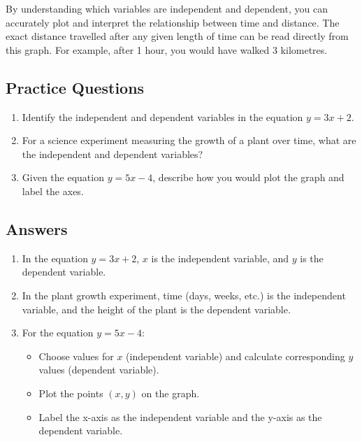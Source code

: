 \documentclass{article}
\begin{document}
By understanding which variables are independent and dependent, you can accurately plot and interpret the relationship between time and distance. The exact distance travelled after any given length of time can be read directly from this graph. For example, after 1 hour, you would have walked 3 kilometres.

\newpage

\subsection*{Practice Questions}

\begin{enumerate}
    \item Identify the independent and dependent variables in the equation \( y = 3x + 2 \).
    \item For a science experiment measuring the growth of a plant over time, what are the independent and dependent variables?
    \item Given the equation \( y = 5x - 4 \), describe how you would plot the graph and label the axes.
\end{enumerate}

\subsection*{Answers}

\begin{enumerate}
    \item In the equation \( y = 3x + 2 \), \( x \) is the independent variable, and \( y \) is the dependent variable.
    \item In the plant growth experiment, time (days, weeks, etc.) is the independent variable, and the height of the plant is the dependent variable.
    \item For the equation \( y = 5x - 4 \):
    \begin{itemize}
        \item Choose values for \( x \) (independent variable) and calculate corresponding \( y \) values (dependent variable).
        \item Plot the points \((x, y)\) on the graph.
        \item Label the x-axis as the independent variable and the y-axis as the dependent variable.
    \end{itemize}
\end{enumerate}
\end{document}
